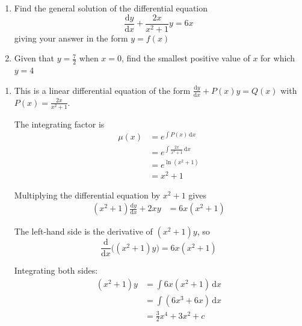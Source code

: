 \documentclass[leqno]{article}
\begin{document}
\djsFrontMatter
\begin{enumerate}[
  label=\textbf{\arabic*.},
  leftmargin=*,
  topsep=0pt,
  partopsep=0pt,
  parsep=0pt
]

\questionitem

\begin{enumerate}[label=\textbf{(\alph*)}]
  \item Find the general solution of the differential equation\\
  \[
  \frac{\mathrm{d}y}{\mathrm{d}x}+\frac{2x}{x^2+1}y=6x
  \]
  giving your answer in the form $y=f(x)$  \\
  \item Given that $y=\tfrac{7}{2}$ when $x=0$, find the smallest positive value of $x$ for which $y=4$  \\
\end{enumerate}

\vspace*{10pt}

\begin{djsSolution}
\begin{enumerate}[label=\textbf{(\alph*)}]
  \item This is a linear differential equation of the form \(\frac{\mathrm{d}y}{\mathrm{d}x}+P(x)y=Q(x)\) with \(P(x)=\frac{2x}{x^2+1}\).

  The integrating factor is
  \begin{align*}
  \mu(x)&=e^{\int P(x)\,\mathrm{d}x} \\
  &=e^{\int \frac{2x}{x^2+1}\,\mathrm{d}x} \\
  &=e^{\ln(x^2+1)} \\
  &=x^2+1
  \end{align*}

  Multiplying the differential equation by $x^2+1$ gives
  \begin{align*}
  (x^2+1)\frac{\mathrm{d}y}{\mathrm{d}x}+2xy&=6x(x^2+1)
  \end{align*}

  The left-hand side is the derivative of $(x^2+1)y$, so
  \[
  \frac{\mathrm{d}}{\mathrm{d}x}\bigl((x^2+1)y\bigr)=6x(x^2+1)
  \]

  Integrating both sides:
  \begin{align*}
  (x^2+1)y&=\int 6x(x^2+1)\,\mathrm{d}x \\
  &=\int (6x^3+6x)\,\mathrm{d}x \\
  &=\frac{3}{2}x^4+3x^2+c
  \end{align*}


\end{enumerate}
\end{djsSolution}
\end{enumerate}
\end{document}
